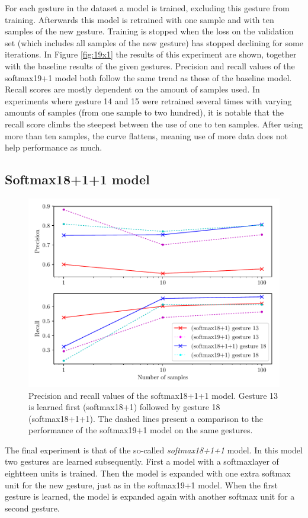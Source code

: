 \documentclass[twocolumn]{phdsymp} %
\begin{document}
For each gesture in the dataset a model is trained, excluding this gesture from training. Afterwards this model is retrained with one sample and with ten samples of the new gesture. Training is stopped when the loss on the validation set (which includes all samples of the new gesture) has stopped declining for some iterations. In Figure \ref{fig:19x1} the results of this experiment are shown, together with the baseline results of the given gestures. Precision and recall values of the softmax19+1 model both follow the same trend as those of the baseline model. Recall scores are mostly dependent on the amount of samples used.
In experiments where gesture 14 and 15 were retrained several times with varying amounts of samples (from one sample to two hundred), it is notable that the recall score climbs the steepest between the use of one to ten samples. After using more than ten samples, the curve flattens, meaning use of more data does not help performance as much.

\subsection{Softmax18+1+1 model}
\begin{figure}
	\includegraphics[width=\columnwidth]{18x2.pdf}
	\caption{Precision and recall values of the softmax18+1+1 model. Gesture 13 is learned first (softmax18+1) followed by gesture 18 (softmax18+1+1). The dashed lines present a comparison to the performance of the softmax19+1 model on the same gestures.}\label{fig:18x2}
\end{figure}
The final experiment is that of the so-called \textit{softmax18+1+1} model. In this model two gestures are learned subsequently. First a model with a softmaxlayer of eightteen units is trained. Then the model is expanded with one extra softmax unit for the new gesture, just as in the softmax19+1 model. When the first gesture is learned, the model is expanded again with another softmax unit for a second gesture.
\end{document}
